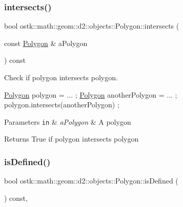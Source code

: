 \subsubsection{\texorpdfstring{intersects()}{intersects()}}
{\footnotesize\ttfamily bool ostk\+::math\+::geom\+::d2\+::objects\+::\+Polygon\+::intersects (\begin{DoxyParamCaption}\item[{const \hyperlink{classostk_1_1math_1_1geom_1_1d2_1_1objects_1_1_polygon}{Polygon} \&}]{a\+Polygon }\end{DoxyParamCaption}) const}



Check if polygon intersects polygon. 


\begin{DoxyCode}
\hyperlink{classostk_1_1math_1_1geom_1_1d2_1_1objects_1_1_polygon_adaf9ef564754ab10ed3dd0d5fa0d90ea}{Polygon} polygon = ... ;
\hyperlink{classostk_1_1math_1_1geom_1_1d2_1_1objects_1_1_polygon_adaf9ef564754ab10ed3dd0d5fa0d90ea}{Polygon} anotherPolygon = ... ;
polygon.intersects(anotherPolygon) ;
\end{DoxyCode}



\begin{DoxyParams}[1]{Parameters}
\mbox{\tt in}  & {\em a\+Polygon} & A polygon \\
\hline
\end{DoxyParams}
\begin{DoxyReturn}{Returns}
True if polygon intersects polygon 
\end{DoxyReturn}
\mbox{\label{classostk_1_1math_1_1geom_1_1d2_1_1objects_1_1_polygon_a81f92393dad2c6421fd4fe3834f60fa2}} 
\subsubsection{\texorpdfstring{is\+Defined()}{isDefined()}}
{\footnotesize\ttfamily bool ostk\+::math\+::geom\+::d2\+::objects\+::\+Polygon\+::is\+Defined (\begin{DoxyParamCaption}{ }\end{DoxyParamCaption}) const\hspace{0.3cm}{\ttfamily [override]}, {\ttfamily [virtual]}}



